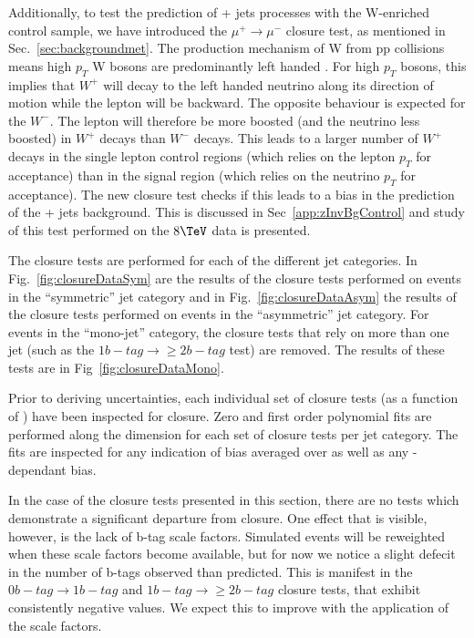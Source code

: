 Additionally, to test the prediction of \znunu + jets processes with
the W-enriched \mj control sample, we have introduced the
$\mu^{+}\rightarrow\mu^{-}$ closure test, as mentioned in
Sec.~\ref{sec:backgroundmet}. The production mechanism of W from pp collisions means
high $p_T$ W bosons are predominantly left handed \cite{WPol}.  
For high $p_T$ bosons, this implies that $W^+$ will decay 
to the left handed neutrino along its direction of motion while 
the lepton will be backward. The opposite behaviour is
expected for the $W^-$. The lepton will therefore be more boosted (and
the neutrino less boosted) in $W^+$ decays than $W^-$ decays.  This
leads to a larger number of $W^+$ decays in the single lepton control
regions (which relies on the lepton $p_T$ for acceptance) than in the
signal region (which relies on the neutrino $p_T$ for acceptance). The
new closure test checks if this leads to a bias in the prediction of the 
\znunu + jets background. This is discussed in
Sec~\ref{app:zInvBgControl} and study of this test performed on the
$8\tev$ data is presented.

The closure tests are performed for each of the different jet
categories. In Fig.~\ref{fig:closureDataSym} are the results of the
closure tests performed on events in the ``symmetric'' jet category
and in Fig.~\ref{fig:closureDataAsym} the results of the closure tests
performed on events in the ``asymmetric'' jet
category. For events in the ``mono-jet'' category, the closure tests
that rely on more than one jet (such as the $1 b-tag\rightarrow\geq 2
b-tag$ test) are removed. The results of these tests are in
Fig~\ref{fig:closureDataMono}.

Prior to deriving uncertainties, each individual set of closure tests
(as a function of \scalht) have been inspected for closure. Zero and first order
polynomial fits are performed along the \scalht dimension for each set
of closure tests per jet category. The fits are inspected for any
indication of bias averaged over \scalht as well as any
\scalht-dependant bias.

In the case of the closure tests presented in this section, there are
no tests which demonstrate a significant departure from closure. One
effect that is visible, however, is the lack of b-tag scale factors.
Simulated events will be reweighted when these scale factors become
available, but for now we notice a slight defecit in the number of
b-tags observed than predicted. This is manifest in the $0 b-tag
\rightarrow 1 b-tag$ and $1 b-tag \rightarrow \geq 2 b-tag$ closure
tests, that exhibit consistently negative values. We expect this to
improve with the application of the scale factors. 

